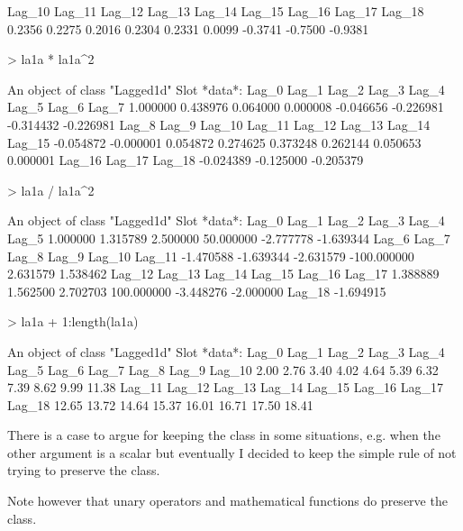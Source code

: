 \documentclass[a4paper,twoside,11pt,nojss,article]{jss}
\begin{document}
\begin{Schunk}
\begin{Soutput}
 Lag_10  Lag_11  Lag_12  Lag_13  Lag_14  Lag_15  Lag_16  Lag_17  Lag_18 
 0.2356  0.2275  0.2016  0.2304  0.2331  0.0099 -0.3741 -0.7500 -0.9381 
\end{Soutput}
\begin{Sinput}
> la1a * la1a^2
\end{Sinput}
\begin{Soutput}
An object of class "Lagged1d"
Slot *data*: 
    Lag_0     Lag_1     Lag_2     Lag_3     Lag_4     Lag_5     Lag_6     Lag_7 
 1.000000  0.438976  0.064000  0.000008 -0.046656 -0.226981 -0.314432 -0.226981 
    Lag_8     Lag_9    Lag_10    Lag_11    Lag_12    Lag_13    Lag_14    Lag_15 
-0.054872 -0.000001  0.054872  0.274625  0.373248  0.262144  0.050653  0.000001 
   Lag_16    Lag_17    Lag_18 
-0.024389 -0.125000 -0.205379 
\end{Soutput}
\begin{Sinput}
> la1a / la1a^2
\end{Sinput}
\begin{Soutput}
An object of class "Lagged1d"
Slot *data*: 
      Lag_0       Lag_1       Lag_2       Lag_3       Lag_4       Lag_5 
   1.000000    1.315789    2.500000   50.000000   -2.777778   -1.639344 
      Lag_6       Lag_7       Lag_8       Lag_9      Lag_10      Lag_11 
  -1.470588   -1.639344   -2.631579 -100.000000    2.631579    1.538462 
     Lag_12      Lag_13      Lag_14      Lag_15      Lag_16      Lag_17 
   1.388889    1.562500    2.702703  100.000000   -3.448276   -2.000000 
     Lag_18 
  -1.694915 
\end{Soutput}
\begin{Sinput}
> la1a + 1:length(la1a)
\end{Sinput}
\begin{Soutput}
An object of class "Lagged1d"
Slot *data*: 
 Lag_0  Lag_1  Lag_2  Lag_3  Lag_4  Lag_5  Lag_6  Lag_7  Lag_8  Lag_9 Lag_10 
  2.00   2.76   3.40   4.02   4.64   5.39   6.32   7.39   8.62   9.99  11.38 
Lag_11 Lag_12 Lag_13 Lag_14 Lag_15 Lag_16 Lag_17 Lag_18 
 12.65  13.72  14.64  15.37  16.01  16.71  17.50  18.41 
\end{Soutput}
\end{Schunk}

There is a case to argue for keeping the class in some situations, e.g. when the other
argument is a scalar but eventually I decided to keep the simple rule of not trying to
preserve the class. 

Note however that unary operators and mathematical functions do preserve the class.
\end{document}

